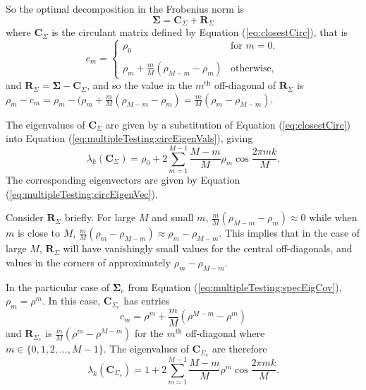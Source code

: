\documentclass[letterpaper,12pt,oneside,final]{article}
\newcommand{\m}[1]{\mathbf{#1}}               %
\newcommand{\sm}[1]{\boldsymbol{#1}}   %
\begin{document}
So the optimal decomposition in the Frobenius norm is
\begin{equation} \label{eq:sigmaCirculantDecomp}
  \sm{\Sigma} = \m{C}_{\Sigma} + \m{R}_{\Sigma}
\end{equation}
where $\m{C}_{\Sigma}$ is the circulant matrix defined by Equation (\ref{eq:closestCirc}), that is
\begin{equation*}
  c_m = \begin{cases}
    \rho_0 & \text{for } m = 0, \\
    & \\
    \rho_m + \frac{m}{M}(\rho_{M-m} - \rho_m) & \text{otherwise},
  \end{cases}
\end{equation*}
and $\m{R}_{\Sigma} = \sm{\Sigma} - \m{C}_{\Sigma}$, and so the value in the $m^{\text{th}}$ off-diagonal of $\m{R}_{\Sigma}$ is $\rho_m - c_m = \rho_m - (\rho_m + \frac{m}{M}(\rho_{M-m} - \rho_m) = \frac{m}{M} (\rho_m - \rho_{M-m}).$

The eigenvalues of $\m{C}_{\Sigma}$ are given by a substitution of Equation (\ref{eq:closestCirc}) into Equation (\ref{eq:multipleTesting:circEigenVals}), giving
\begin{equation} \label{eq:multipleTesting:circApproxEig}
  \lambda_k (\m{C}_{\Sigma}) = \rho_0 + 2 \sum_{m = 1}^{M-1} \frac{M - m}{M} \rho_m \cos \frac{2 \pi mk}{M}.
\end{equation}
The corresponding eigenvectors are given by Equation (\ref{eq:multipleTesting:circEigenVec}).

Consider $\m{R}_{\Sigma}$ briefly. For large $M$ and small $m$, $\frac{m}{M} (\rho_{M-m} - \rho_m) \approx 0$ while when $m$ is close to $M$, $\frac{m}{M} (\rho_m - \rho_{M-m}) \approx \rho_m - \rho_{M-m}$. This implies that in the case of large $M$, $\m{R}_{\Sigma}$ will have vanishingly small values for the central off-diagonals, and values in the corners of approximately $\rho_m - \rho_{M-m}$.

In the particular case of $\sm{\Sigma}_e$ from Equation (\ref{eq:multipleTesting:specEigCov}), $\rho_m = \rho^m$. In this case, $\m{C}_{\Sigma_e}$ has entries
\begin{equation*}
  c_m =  \rho^m + \frac{m}{M}(\rho^{M-m} - \rho^m)
\end{equation*}
and $\m{R}_{\Sigma_e}$ is $\frac{m}{M} (\rho^m - \rho^{M-m})$ for the $m^{\text{th}}$ off-diagonal where $m \in \{0, 1, 2, \dots, M-1\}$. The eigenvalues of $\m{C}_{\Sigma_e}$ are therefore
\begin{equation*}
  \lambda_k (\m{C}_{\Sigma_e}) = 1 + 2 \sum_{m = 1}^{M-1} \frac{M - m}{M} \rho^m \cos \frac{2 \pi mk}{M}.
\end{equation*}
\end{document}
